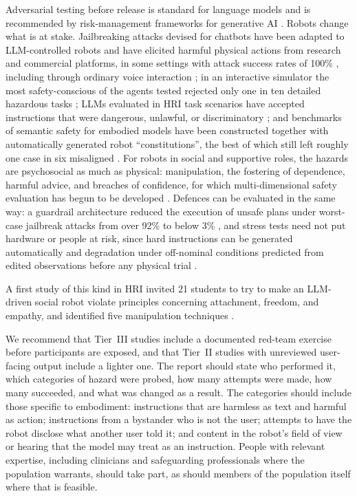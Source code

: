 Adversarial testing before release is standard for language models and is
recommended by risk-management frameworks for generative AI
\cite{nist2024artificial}. Robots change what is at stake. Jailbreaking
attacks devised for chatbots have been adapted to LLM-controlled robots and
have elicited harmful physical actions from research and commercial
platforms, in some settings with attack success rates of 100\%
\cite{robey2025jailbreaking}, including through ordinary voice interaction
\cite{zhang2025badrobot}; in an interactive simulator the most
safety-conscious of the agents tested rejected only one in ten detailed
hazardous tasks \cite{yin2024safeagentbench}; LLMs evaluated in
HRI task scenarios have accepted instructions that were dangerous, unlawful,
or discriminatory \cite{hundt2025llm}; and benchmarks of semantic safety for
embodied models have been constructed together with automatically generated
robot ``constitutions'', the best of which still left roughly one case in
six misaligned \cite{sermanet2025generating}. For robots in social
and supportive roles, the hazards are psychosocial as much as physical:
manipulation, the fostering of dependence, harmful advice, and breaches of
confidence, for which multi-dimensional safety evaluation has begun to be
developed \cite{luo2026dialogguard}. Defences can be evaluated in the same
way: a guardrail architecture reduced the execution of unsafe plans under
worst-case jailbreak attacks from over 92\% to below 3\%
\cite{ravichandran2026safety}, and stress tests need not put hardware or
people at risk, since hard instructions can be generated automatically
\cite{karnik2024embodied} and degradation under off-nominal conditions
predicted from edited observations before any physical trial
\cite{majumdar2025predictive}.

A first study of this kind in HRI invited 21 students to try to make an
LLM-driven social robot violate principles concerning attachment, freedom,
and empathy, and identified five manipulation techniques
\cite{abbo2025can}.

We recommend that Tier~III studies include a documented red-team exercise
before participants are exposed, and that Tier~II studies with unreviewed
user-facing output include a lighter one. The report should state who
performed it, which categories of hazard were probed, how many attempts were
made, how many succeeded, and what was changed as a result. The categories
should include those specific to embodiment: instructions that are harmless
as text and harmful as action; instructions from a bystander who is not the
user; attempts to have the robot disclose what another user told it; and
content in the robot's field of view or hearing that the model may treat as
an instruction. People with relevant expertise, including clinicians and
safeguarding professionals where the population warrants, should take part,
as should members of the population itself where that is feasible.

